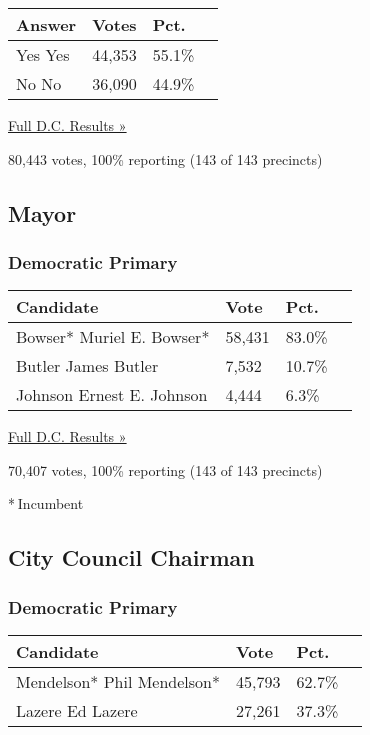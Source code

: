 \begin{longtable}[]{@{}llll@{}}
\toprule
Answer & Votes & Pct. &\tabularnewline
\midrule
\endhead
 Yes Yes & 44,353 & 55.1\% &\tabularnewline
 No No & 36,090 & 44.9\% &\tabularnewline
\bottomrule
\end{longtable}

\href{https://www.nytimes3xbfgragh.onion/elections/results/district-of-columbia}{Full
D.C. Results »}

80,443 votes, 100\% reporting (143 of 143 precincts)

\hypertarget{mayor}{%
\subsection{Mayor}\label{mayor}}

\hypertarget{democratic-primary}{%
\subsubsection{Democratic Primary}\label{democratic-primary}}

\begin{longtable}[]{@{}llll@{}}
\toprule
Candidate & Vote & Pct. &\tabularnewline
\midrule
\endhead
 Bowser* Muriel E. Bowser* & 58,431 & 83.0\% &\tabularnewline
 Butler James Butler & 7,532 & 10.7\% &\tabularnewline
 Johnson Ernest E. Johnson & 4,444 & 6.3\% &\tabularnewline
\bottomrule
\end{longtable}

\href{https://www.nytimes3xbfgragh.onion/elections/results/district-of-columbia}{Full
D.C. Results »}

70,407 votes, 100\% reporting (143 of 143 precincts)

* Incumbent

\hypertarget{city-council-chairman}{%
\subsection{City Council Chairman}\label{city-council-chairman}}

\hypertarget{democratic-primary-1}{%
\subsubsection{Democratic Primary}\label{democratic-primary-1}}

\begin{longtable}[]{@{}llll@{}}
\toprule
Candidate & Vote & Pct. &\tabularnewline
\midrule
\endhead
 Mendelson* Phil Mendelson* & 45,793 & 62.7\% &\tabularnewline
 Lazere Ed Lazere & 27,261 & 37.3\% &\tabularnewline
\bottomrule
\end{longtable}

